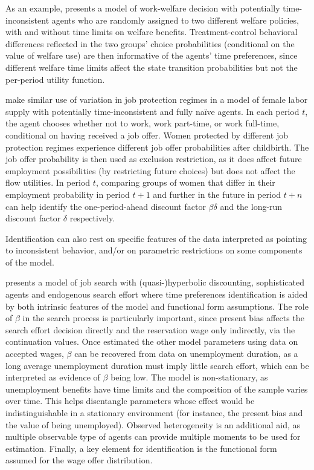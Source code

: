 As an example, \textcite{Chan2017} presents a model of work-welfare decision with potentially time-inconsistent agents who are randomly assigned to two different welfare policies, with and without time limits on welfare benefits. Treatment-control behavioral differences reflected in the two groups' choice probabilities (conditional on the value of welfare use) are then informative of the agents' time preferences, since different welfare time limits affect the state transition probabilities but not the per-period utility function. 

\textcite{Haan2020} make similar use of variation in job protection regimes in a model of female labor supply with potentially time-inconsistent and fully naïve agents. In each period $t$, the agent chooses whether not to work, work part-time, or work full-time, conditional on having received a job offer. 
Women protected by different job protection regimes experience different job offer probabilities after childbirth. The job offer probability is then used as exclusion restriction, as it does affect future employment possibilities (by restricting future choices) but does not affect the flow utilities. In period $t$, comparing groups of women that differ in their employment probability in period $t+1$ and further in the future in period $t+n$ can help identify the one-period-ahead discount factor $\beta\delta$ and the long-run discount factor $\delta$ respectively.

Identification can also rest on specific features of the data interpreted as pointing to inconsistent behavior, and/or on parametric restrictions on some components of the model. 

\textcite{Paserman2008} presents a model of job search with (quasi-)hyperbolic discounting, sophisticated agents and endogenous search effort where time preferences identification is aided by both intrinsic features of the model and functional form assumptions. The role of $\beta$ in the search process is particularly important, since present bias affects the search effort decision directly and the reservation wage only indirectly, via the continuation values. Once estimated the other model parameters using data on accepted wages, $\beta$ can be recovered from data on unemployment duration, as a long average unemployment duration must imply little search effort, which can be interpreted as evidence of $\beta$ being low. The model is non-stationary, as unemployment benefits have time limits and the composition of the sample varies over time. This helps disentangle parameters whose effect would be indistinguishable in a stationary environment (for instance, the present bias and the value of being unemployed). Observed heterogeneity is an additional aid, as multiple observable type of agents can provide multiple moments to be used for estimation. Finally, a key element for identification is the functional form assumed for the wage offer distribution. 

